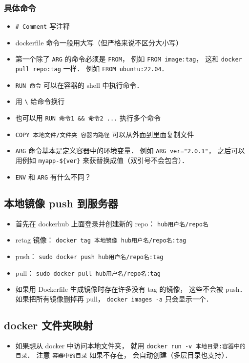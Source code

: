 \subsubsection{具体命令}
\begin{itemize}
\item \verb|# Comment| 写注释
\item dockerfile 命令一般用大写（但严格来说不区分大小写）
\item 第一个除了 \verb|ARG| 的命令必须是 \verb|FROM|， 例如 \verb|FROM image:tag|， 这和 \verb|docker pull repo:tag| 一样． 例如 \verb|FROM ubuntu:22.04|．
\item \verb|RUN 命令| 可以在容器的 shell 中执行命令．
\item 用 \verb|\| 给命令换行
\item 也可以用 \verb|RUN 命令1 && 命令2 ...| 执行多个命令
\item \verb|COPY 本地文件/文件夹 容器内路径| 可以从外面到里面复制文件
\item \verb|ARG| 命令基本是定义容器中的环境变量． 例如 \verb|ARG ver="2.0.1"|， 之后可以用例如 \verb|myapp-${ver}| 来获替换成值（双引号不会包含）．
\item \verb|ENV| 和 \verb|ARG| 有什么不同？
\end{itemize}

\subsection{本地镜像 push 到服务器}
\begin{itemize}
\item 首先在 dockerhub 上面登录并创建新的 repo： \verb|hub用户名/repo名|
\item retag 镜像： \verb|docker tag 本地镜像 hub用户名/repo名:tag|
\item push： \verb|sudo docker push hub用户名/repo名:tag|
\item pull： \verb|sudo docker pull hub用户名/repo名:tag|
\item 如果用 Dockerfile 生成镜像时存在许多没有 tag 的镜像， 这些不会被 push． 如果把所有镜像删掉再 pull， \verb|docker images -a| 只会显示一个．
\end{itemize}

\subsection{docker 文件夹映射}
\begin{itemize}
\item 如果想从 docker 中访问本地文件夹， 就用 \verb|docker run -v 本地目录:容器中的目录|． 注意 \verb|容器中的目录| 如果不存在， 会自动创建（多层目录也支持）．
\end{itemize}

